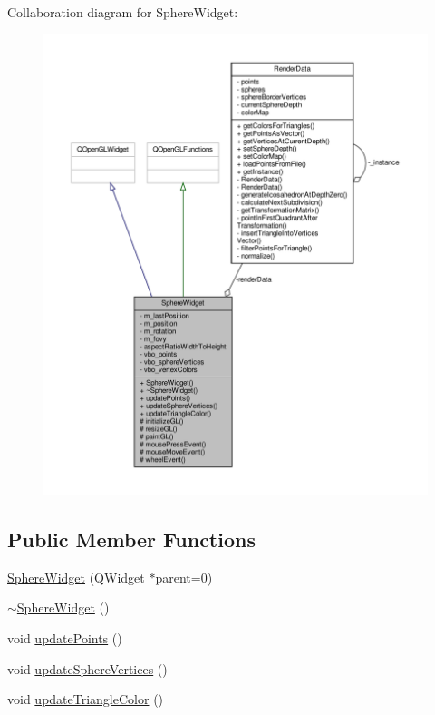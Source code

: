 Collaboration diagram for Sphere\+Widget\+:\nopagebreak
\begin{figure}[H]
\begin{center}
\leavevmode
\includegraphics[width=350pt]{d5/d59/class_sphere_widget__coll__graph}
\end{center}
\end{figure}
\subsection*{Public Member Functions}
\begin{DoxyCompactItemize}
\item 
\hyperlink{class_sphere_widget_a6ee7b3a4b58e5d62fb1c901aafdd1790}{Sphere\+Widget} (Q\+Widget $\ast$parent=0)
\item 
\hyperlink{class_sphere_widget_a1766e5d68f4c57f52d6b1ee40cc0326c}{$\sim$\+Sphere\+Widget} ()
\item 
void \hyperlink{class_sphere_widget_a692ca1c1e7556f6abd7b5f6a49a2557c}{update\+Points} ()
\item 
void \hyperlink{class_sphere_widget_a7d132800fb4d6b7b925c253679bb6445}{update\+Sphere\+Vertices} ()
\item 
void \hyperlink{class_sphere_widget_a871c5252a7a218c5d405be5dfc3dbfa1}{update\+Triangle\+Color} ()
\end{DoxyCompactItemize}
